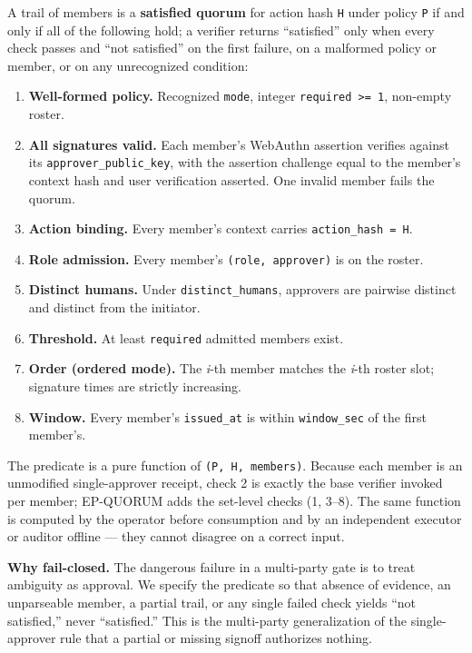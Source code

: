 \documentclass[
  11pt,
]{article}
\providecommand{\tightlist}{%
  \setlength{\itemsep}{0pt}\setlength{\parskip}{0pt}}
\begin{document}
A trail of members is a \textbf{satisfied quorum} for action hash
\texttt{H} under policy \texttt{P} if and only if all of the following
hold; a verifier returns ``satisfied'' only when every check passes and
``not satisfied'' on the first failure, on a malformed policy or member,
or on any unrecognized condition:

\begin{enumerate}
\def\labelenumi{\arabic{enumi}.}
\tightlist
\item
  \textbf{Well-formed policy.} Recognized \texttt{mode}, integer
  \texttt{required\ \textgreater{}=\ 1}, non-empty roster.
\item
  \textbf{All signatures valid.} Each member's WebAuthn assertion
  verifies against its \texttt{approver\_public\_key}, with the
  assertion challenge equal to the member's context hash and user
  verification asserted. One invalid member fails the quorum.
\item
  \textbf{Action binding.} Every member's context carries
  \texttt{action\_hash\ =\ H}.
\item
  \textbf{Role admission.} Every member's \texttt{(role,\ approver)} is
  on the roster.
\item
  \textbf{Distinct humans.} Under \texttt{distinct\_humans}, approvers
  are pairwise distinct and distinct from the initiator.
\item
  \textbf{Threshold.} At least \texttt{required} admitted members exist.
\item
  \textbf{Order (ordered mode).} The \emph{i}-th member matches the
  \emph{i}-th roster slot; signature times are strictly increasing.
\item
  \textbf{Window.} Every member's \texttt{issued\_at} is within
  \texttt{window\_sec} of the first member's.
\end{enumerate}

The predicate is a pure function of \texttt{(P,\ H,\ members)}. Because
each member is an unmodified single-approver receipt, check 2 is exactly
the base verifier invoked per member; EP-QUORUM adds the set-level
checks (1, 3--8). The same function is computed by the operator before
consumption and by an independent executor or auditor offline --- they
cannot disagree on a correct input.

\textbf{Why fail-closed.} The dangerous failure in a multi-party gate is
to treat ambiguity as approval. We specify the predicate so that absence
of evidence, an unparseable member, a partial trail, or any single
failed check yields ``not satisfied,'' never ``satisfied.'' This is the
multi-party generalization of the single-approver rule that a partial or
missing signoff authorizes nothing.
\end{document}
